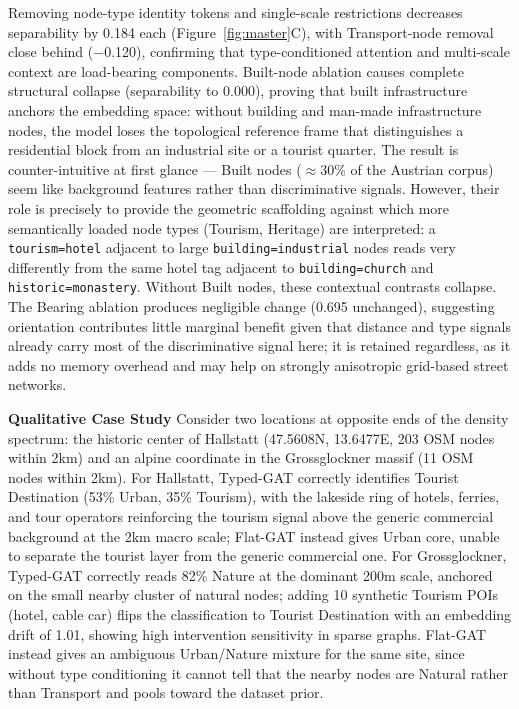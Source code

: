 \documentclass[]{interact}
\theoremstyle{plain}%
\theoremstyle{definition}
\theoremstyle{remark}
\begin{document}
Removing node-type identity tokens and single-scale restrictions decreases separability by 0.184 each (Figure~\ref{fig:master}C), with Transport-node removal close behind ($-$0.120), confirming that type-conditioned attention and multi-scale context are load-bearing components. Built-node ablation causes complete structural collapse (separability to 0.000), proving that built infrastructure anchors the embedding space: without building and man-made infrastructure nodes, the model loses the topological reference frame that distinguishes a residential block from an industrial site or a tourist quarter. The result is counter-intuitive at first glance --- Built nodes ($\approx$30\% of the Austrian corpus) seem like background features rather than discriminative signals. However, their role is precisely to provide the geometric scaffolding against which more semantically loaded node types (Tourism, Heritage) are interpreted: a \texttt{tourism=hotel} adjacent to large \texttt{building=industrial} nodes reads very differently from the same hotel tag adjacent to \texttt{building=church} and \texttt{historic=monastery}. Without Built nodes, these contextual contrasts collapse. The Bearing ablation produces negligible change (0.695 unchanged), suggesting orientation contributes little marginal benefit given that distance and type signals already carry most of the discriminative signal here; it is retained regardless, as it adds no memory overhead and may help on strongly anisotropic grid-based street networks.

\textbf{Qualitative Case Study} Consider two locations at opposite ends of the density spectrum: the historic center of Hallstatt (47.5608\textdegree{}N, 13.6477\textdegree{}E, 203 OSM nodes within 2km) and an alpine coordinate in the Grossglockner massif (11 OSM nodes within 2km). For Hallstatt, Typed-GAT correctly identifies Tourist Destination (53\% Urban, 35\% Tourism), with the lakeside ring of hotels, ferries, and tour operators reinforcing the tourism signal above the generic commercial background at the 2km macro scale; Flat-GAT instead gives Urban core, unable to separate the tourist layer from the generic commercial one. For Grossglockner, Typed-GAT correctly reads 82\% Nature at the dominant 200m scale, anchored on the small nearby cluster of natural nodes; adding 10 synthetic Tourism POIs (hotel, cable car) flips the classification to Tourist Destination with an embedding drift of 1.01, showing high intervention sensitivity in sparse graphs. Flat-GAT instead gives an ambiguous Urban/Nature mixture for the same site, since without type conditioning it cannot tell that the nearby nodes are Natural rather than Transport and pools toward the dataset prior.
\end{document}
